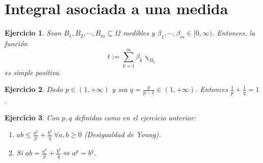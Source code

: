 \documentclass[11pt, a4paper]{article}
\theoremstyle{theorem-style}
\theoremstyle{definition-style}
\newtheorem{ejer}{Ejercicio}[section]
\theoremstyle{remark-style}
\theoremstyle{example-style}
\begin{document}
\newpage



\section{Integral asociada a una medida}

\begin{ejer} Sean $B_1,B_2,\cdots,B_m \subseteq \Omega$ medibles y $\beta_1,\cdots,\beta_m\in[0,\infty)$. Entonces, la función $$t:= \sum_{k=1}^m \beta_k \upchi_{B_k}$$  es simple positiva.

\end{ejer}


\begin{ejer}
  Dado $p \in (1, +\infty)$ y sea $q = \frac{p}{p-1} \in (1, +\infty)$. Entonces $\frac{1}{p} + \frac{1}{q} = 1$.
\end{ejer}

\begin{ejer}
  Con $p, q$ definidos como en el ejercicio anterior:
  \begin{enumerate}
  \item $ \displaystyle ab \leq \frac{a^p}{p} + \frac{b^q}{q} \ \forall a, b \geq 0$ (Desigualdad de Young).
  \item Si $ \displaystyle ab = \frac{a^p}{p} + \frac{b^q}{q} \Leftrightarrow a^p = b^q$.
  \end{enumerate}
\end{ejer}
\end{document}
